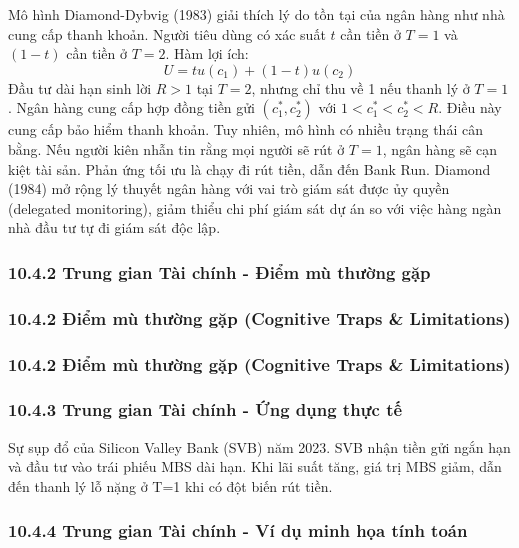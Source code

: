 \documentclass[
]{article}
\begin{document}
Mô hình Diamond-Dybvig (1983) giải thích lý do tồn tại của ngân hàng như
nhà cung cấp thanh khoản. Người tiêu dùng có xác suất \(t\) cần tiền ở
\(T=1\) và \((1-t)\) cần tiền ở \(T=2\). Hàm lợi ích:
\[ U = t u(c_1) + (1-t) u(c_2) \] Đầu tư dài hạn sinh lời \(R > 1\) tại
\(T=2\), nhưng chỉ thu về 1 nếu thanh lý ở \(T=1\). Ngân hàng cung cấp
hợp đồng tiền gửi \((c_1^*, c_2^*)\) với \(1 < c_1^* < c_2^* < R\). Điều
này cung cấp bảo hiểm thanh khoản. Tuy nhiên, mô hình có nhiều trạng
thái cân bằng. Nếu người kiên nhẫn tin rằng mọi người sẽ rút ở \(T=1\),
ngân hàng sẽ cạn kiệt tài sản. Phản ứng tối ưu là chạy đi rút tiền, dẫn
đến Bank Run. Diamond (1984) mở rộng lý thuyết ngân hàng với vai trò
giám sát được ủy quyền (delegated monitoring), giảm thiểu chi phí giám
sát dự án so với việc hàng ngàn nhà đầu tư tự đi giám sát độc lập.

\subsubsection{10.4.2 Trung gian Tài chính - Điểm mù thường
gặp}\label{trung-gian-tuxe0i-chuxednh---ux111iux1ec3m-muxf9-thux1b0ux1eddng-gux1eb7p}

\subsubsection{10.4.2 Điểm mù thường gặp (Cognitive Traps \&
Limitations)}\label{ux111iux1ec3m-muxf9-thux1b0ux1eddng-gux1eb7p-cognitive-traps-limitations-82}

\subsubsection{10.4.2 Điểm mù thường gặp (Cognitive Traps \&
Limitations)}\label{ux111iux1ec3m-muxf9-thux1b0ux1eddng-gux1eb7p-cognitive-traps-limitations-83}

\subsubsection{10.4.3 Trung gian Tài chính - Ứng dụng thực
tế}\label{trung-gian-tuxe0i-chuxednh---ux1ee9ng-dux1ee5ng-thux1ef1c-tux1ebf}

Sự sụp đổ của Silicon Valley Bank (SVB) năm 2023. SVB nhận tiền gửi ngắn
hạn và đầu tư vào trái phiếu MBS dài hạn. Khi lãi suất tăng, giá trị MBS
giảm, dẫn đến thanh lý lỗ nặng ở T=1 khi có đột biến rút tiền.

\subsubsection{10.4.4 Trung gian Tài chính - Ví dụ minh họa tính
toán}\label{trung-gian-tuxe0i-chuxednh---vuxed-dux1ee5-minh-hux1ecda-tuxednh-touxe1n}
\end{document}
